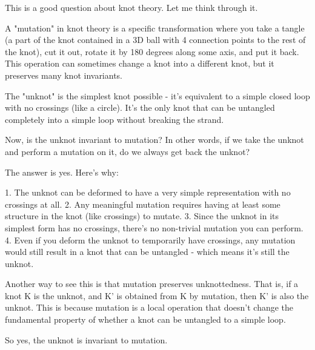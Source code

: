 \documentclass[12p]{article}
\newcounter{reasoningcounter}
\newenvironment{reasoning}[1][]
{\refstepcounter{reasoningcounter}%
\begin{tcolorbox}[
    title=Reasoning \thereasoningcounter: #1,
    colback=white, %
    colframe=gray,
    coltext=black, %
    fonttitle=\bfseries\normalsize,
    top=2mm,
    bottom=2mm,
    enlarge top initially by=5mm
]
\small
}
{\end{tcolorbox}}
\begin{document}
\begin{reasoning}[by anthropic/claude-3.7-sonnet:thinking (generated in 0 minutes and 9 seconds.)]
This is a good question about knot theory. Let me think through it.

A "mutation" in knot theory is a specific transformation where you take a tangle (a part of the knot contained in a 3D ball with 4 connection points to the rest of the knot), cut it out, rotate it by 180 degrees along some axis, and put it back. This operation can sometimes change a knot into a different knot, but it preserves many knot invariants.

The "unknot" is the simplest knot possible - it's equivalent to a simple closed loop with no crossings (like a circle). It's the only knot that can be untangled completely into a simple loop without breaking the strand.

Now, is the unknot invariant to mutation? In other words, if we take the unknot and perform a mutation on it, do we always get back the unknot?

The answer is yes. Here's why:

1. The unknot can be deformed to have a very simple representation with no crossings at all.
2. Any meaningful mutation requires having at least some structure in the knot (like crossings) to mutate.
3. Since the unknot in its simplest form has no crossings, there's no non-trivial mutation you can perform.
4. Even if you deform the unknot to temporarily have crossings, any mutation would still result in a knot that can be untangled - which means it's still the unknot.

Another way to see this is that mutation preserves unknottedness. That is, if a knot K is the unknot, and K' is obtained from K by mutation, then K' is also the unknot. This is because mutation is a local operation that doesn't change the fundamental property of whether a knot can be untangled to a simple loop.

So yes, the unknot is invariant to mutation.
\end{reasoning}
\end{document}
